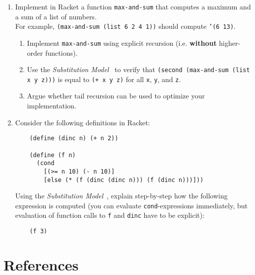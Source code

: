 \documentclass[dvipsnames]{article}
\newcommand{\racket}[1]{\texttt{#1}}
\begin{document}
\begin{enumerate}
  \item Implement in Racket a function \racket{max-and-sum} that computes a maximum and a sum of a list of numbers. \\
    For example,
    \racket{(max-and-sum (list 6 2 4 1))} should compute \racket{'(6 13)}.
    \begin{enumerate}
      \item Implement \racket{max-and-sum} using explicit recursion (i.e. \textbf{without} higher-order functions).
      \item Use the \emph{Substitution Model}~\cite[\S 1.1.5]{AbelsonSussman1996sicp} to verify that \racket{(second (max-and-sum (list x y z)))} is equal to \racket{(+ x y z)}
      for all \racket{x}, \racket{y}, and \racket{z}.
      \item Argue whether tail recursion can be used to optimize your implementation.
    \end{enumerate}

    \item Consider the following definitions in Racket:
    \begin{verbatim}
    (define (dinc n) (+ n 2))

    (define (f n)
      (cond
        [(>= n 10) (- n 10)]
        [else (* (f (dinc (dinc n))) (f (dinc n)))]))
    \end{verbatim}
    Using the \emph{Substitution Model}~\cite[\S 1.1.5]{AbelsonSussman1996sicp},
    explain step-by-step how the following expression
    is computed (you can evaluate \racket{cond}-expressions immediately,
    but evaluation of function calls to \racket{f} and \racket{dinc} have to be explicit):
    \begin{verbatim}
    (f 3)
    \end{verbatim}
\end{enumerate}

\section*{References}
\printbibliography[heading=none]
\end{document}
